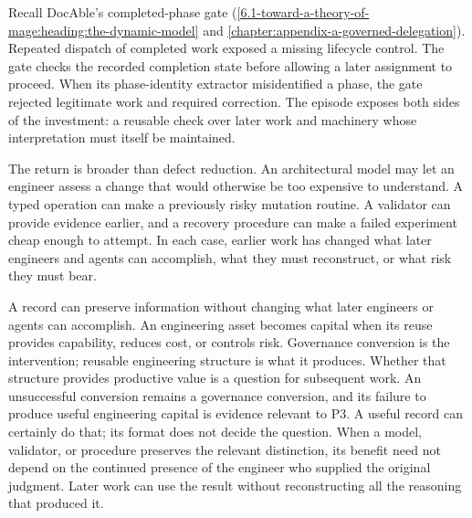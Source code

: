Recall DocAble's completed-phase gate (\autoref{6.1-toward-a-theory-of-mage:heading:the-dynamic-model} and \autoref{chapter:appendix-a-governed-delegation}). Repeated dispatch of completed work exposed a missing lifecycle control. The gate checks the recorded completion state before allowing a later assignment to proceed. When its phase-identity extractor misidentified a phase, the gate rejected legitimate work and required correction. The episode exposes both sides of the investment: a reusable check over later work and machinery whose interpretation must itself be maintained.


The return is broader than defect reduction. An architectural model may let an engineer assess a change that would otherwise be too expensive to understand. A typed operation can make a previously risky mutation routine. A validator can provide evidence earlier, and a recovery procedure can make a failed experiment cheap enough to attempt. In each case, earlier work has changed what later engineers and agents can accomplish, what they must reconstruct, or what risk they must bear.

A record can preserve information without changing what later engineers or agents can accomplish. An engineering asset becomes capital when its reuse provides capability, reduces cost, or controls risk. Governance conversion is the intervention; reusable engineering structure is what it produces. Whether that structure provides productive value is a question for subsequent work. An unsuccessful conversion remains a governance conversion, and its failure to produce useful engineering capital is evidence relevant to P3. A useful record can certainly do that; its format does not decide the question. When a model, validator, or procedure preserves the relevant distinction, its benefit need not depend on the continued presence of the engineer who supplied the original judgment. Later work can use the result without reconstructing all the reasoning that produced it.


